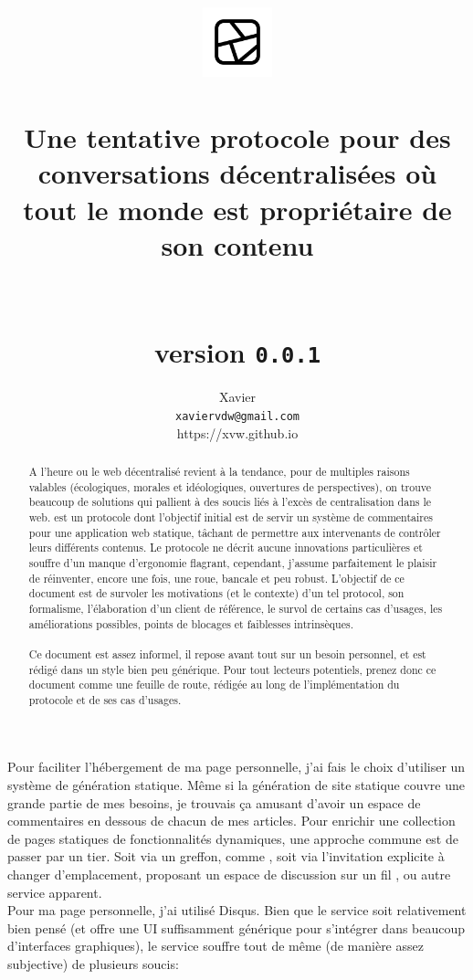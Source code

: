 \documentclass[a4paper,10pt]{article}
\title{
  \includegraphics[width=2cm]{../iconography/phragment-black.png}\\
  \bsc{Phragment}\\
  \large{
    Une tentative protocole pour des conversations décentralisées
    où tout le monde est propriétaire de son contenu\\~\\~\\
    \textbf{version} \texttt{0.0.1}
  }
}
\date{}
\author{
  Xavier \bsc{Van de Woestyne}\\
  \texttt{xaviervdw@gmail.com}\\
  \small{https://xvw.github.io}
}
\newcommand{\ahref}[3][blue]{\href{#2}{\color{#1}{#3}}}
\begin{document}
\maketitle

\begin{abstract}
  A l'heure ou le web décentralisé revient à la tendance, pour de multiples
  raisons valables (écologiques, morales et idéologiques, ouvertures de
  perspectives), on trouve beaucoup de solutions qui pallient à des soucis
  liés à l'excès de centralisation dans le web.  est un
  protocole dont l'objectif initial est de servir un système de commentaires
  pour une application web statique, tâchant de permettre aux intervenants
  de contrôler leurs différents contenus. Le protocole ne décrit aucune
  innovations particulières et souffre d'un manque d'ergonomie flagrant,
  cependant, j'assume parfaitement le plaisir de réinventer, encore une fois,
  une roue, bancale et peu robust. L'objectif de ce document est de survoler
  les motivations (et le contexte) d'un tel protocol, son formalisme,
  l'élaboration d'un client de référence, le survol de certains cas d'usages,
  les améliorations possibles, points de blocages et faiblesses intrinsèques.
  \\~\\
  Ce document est assez informel, il repose avant tout sur un besoin
  personnel, et est rédigé dans un style bien peu générique. Pour tout lecteurs
  potentiels, prenez donc ce document comme une feuille de route, rédigée
  au long de l'implémentation du protocole et de ses cas d'usages.
  \\
\end{abstract}

Pour faciliter l'hébergement de ma page personnelle, j'ai fais le choix d'utiliser un
système de génération statique. Même si la génération de site statique couvre une
grande partie de mes besoins, je trouvais ça amusant d'avoir un espace de
commentaires en dessous de chacun de mes articles. Pour enrichir une collection de
pages statiques de fonctionnalités dynamiques, une approche commune est de passer
par un tier. Soit via un greffon, comme \ahref{https://disqus.com/}{Disqus}, soit
via l'invitation explicite à changer d'emplacement, proposant un espace de discussion
sur un fil \ahref{https://www.reddit.com/}{Reddit},
\ahref{https://news.ycombinator.com/}{Hacker news} ou autre service apparent.\\
Pour ma page personnelle, j'ai utilisé Disqus. Bien que le service soit relativement
bien pensé (et offre une UI suffisamment générique pour s'intégrer dans beaucoup
d'interfaces graphiques), le service souffre tout de même (de manière assez
subjective) de plusieurs soucis:\\
\end{document}
